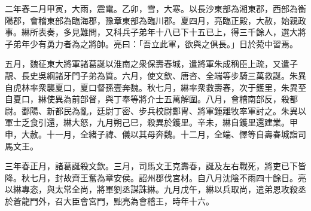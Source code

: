 \begin{pinyinscope}
 
二年春二月甲寅，大雨，震電。乙卯，雪，大寒。以長沙東部為湘東郡，西部為衡陽郡，會稽東部為臨海郡，豫章東部為臨川郡。夏四月，亮臨正殿，大赦，始親政事。綝所表奏，多見難問，又科兵子弟年十八已下十五已上，得三千餘人，選大將子弟年少有勇力者為之將帥。亮曰：「吾立此軍，欲與之俱長。」日於菀中習焉。
 
 
 
 
 五月，魏征東大將軍諸葛誕以淮南之衆保壽春城，遣將軍朱成稱臣上疏，又遣子靚、長史吳綱諸牙門子弟為質。六月，使文欽、唐咨、全端等步騎三萬救誕。朱異自虎林率衆襲夏口，夏口督孫壹奔魏。秋七月，綝率衆救壽春，次于鑊里，朱異至自夏口，綝使異為前部督，與丁奉等將介士五萬解圍。八月，會稽南部反，殺都尉。鄱陽、新都民為亂，廷尉丁密、步兵校尉鄭冑、將軍鍾離牧率軍討之。朱異以軍士乏食引還，綝大怒，九月朔己巳，殺異於鑊里。辛未，綝自鑊里還建業。甲申，大赦。十一月，全緒子禕、儀以其母奔魏。十二月，全端、懌等自壽春城詣司馬文王。
 
 
 
 
 三年春正月，諸葛誕殺文欽。三月，司馬文王克壽春，誕及左右戰死，將吏已下皆降。秋七月，封故齊王奮為章安侯。詔州郡伐宮材。自八月沈陰不雨四十餘日。亮以綝專恣，與太常全尚，將軍劉丞謀誅綝。九月戊午，綝以兵取尚，遣弟恩攻殺丞於蒼龍門外，召大臣會宮門，黜亮為會稽王，時年十六。
 
 
\end{pinyinscope}